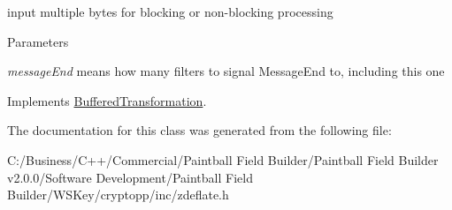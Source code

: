 input multiple bytes for blocking or non-\/blocking processing 
\begin{DoxyParams}{Parameters}
\item[{\em messageEnd}]means how many filters to signal MessageEnd to, including this one \end{DoxyParams}


Implements \hyperlink{class_buffered_transformation_ad396dcb42260f23125a35ec0e5d17d55}{BufferedTransformation}.

The documentation for this class was generated from the following file:\begin{DoxyCompactItemize}
\item 
C:/Business/C++/Commercial/Paintball Field Builder/Paintball Field Builder v2.0.0/Software Development/Paintball Field Builder/WSKey/cryptopp/inc/zdeflate.h\end{DoxyCompactItemize}
